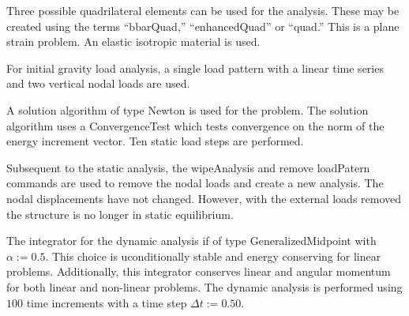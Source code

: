 \documentclass[12pt]{article}
\begin{document}
Three possible quadrilateral elements can be used for the analysis.
These may be created using the terms
``bbarQuad,''
``enhancedQuad'' or
``quad.''  This is a plane strain problem.
An elastic isotropic material is used.

For initial gravity load analysis, a single load pattern 
with a linear time series and two vertical nodal loads are used. 


\vspace{0.2in}

A solution algorithm of type Newton is used for the 
problem. The solution algorithm uses a ConvergenceTest which tests
convergence on the norm of the energy increment vector. 
Ten static load steps are performed.

Subsequent to the static analysis, the wipeAnalysis and 
remove loadPatern commands are used 
to remove the nodal loads and create a new analysis.  The nodal 
displacements have not changed.  However, with the external loads removed
the structure is no longer in static equilibrium.

The integrator for the dynamic analysis if of type 
GeneralizedMidpoint with $\alpha := 0.5$.  This choice 
is uconditionally stable and energy conserving for linear problems.
Additionally, this integrator conserves linear and
angular momentum for both linear and non-linear problems.
The dynamic analysis is performed using $100$ time increments with
a time step $\Delta t := 0.50$.
\end{document}
